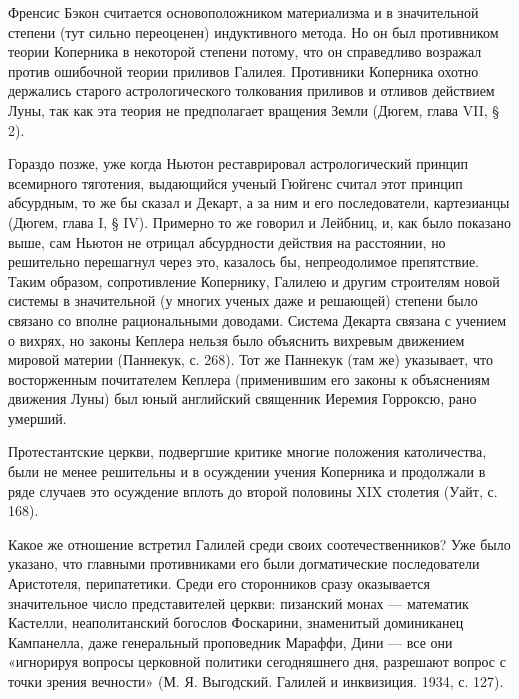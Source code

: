 Френсис Бэкон считается основоположником материализма и в значительной
степени  (тут  сильно  переоценен)  индуктивного  метода.  Но  он  был
противником  теории  Коперника  в  некоторой степени  потому,  что  он
справедливо  возражал   против  ошибочной  теории   приливов  Галилея.
Противники   Коперника  охотно   держались  старого   астрологического
толкования приливов  и отливов действием  Луны, так как эта  теория не
предполагает вращения Земли (Дюгем, глава VII, § 2).

Гораздо позже, уже когда  Ньютон реставрировал астрологический принцип
всемирного тяготения,  выдающийся ученый  Гюйгенс считал  этот принцип
абсурдным, то  же бы сказал  и Декарт, а  за ним и  его последователи,
картезианцы (Дюгем, глава I, § IV).  Примерно то же говорил и Лейбниц,
и, как было показано выше,  сам Ньютон не отрицал абсурдности действия
на  расстоянии,  но  решительно  перешагнул через  это,  казалось  бы,
непреодолимое  препятствие.  Таким образом,  сопротивление  Копернику,
Галилею и  другим строителям  новой системы  в значительной  (у многих
ученых даже и  решающей) степени было связано  со вполне рациональными
доводами.  Система  Декарта связана  с  учением  о вихрях,  но  законы
Кеплера  нельзя  было  объяснить вихревым  движением  мировой  материи
(Паннекук,  с.  268).   Тот  же  Паннекук  (там   же)  указывает,  что
восторженным почитателем Кеплера (применившим его законы к объяснениям
движения Луны)  был юный  английский священник Иеремия  Горроксю, рано
умерший.

Протестантские   церкви,    подвергшие   критике    многие   положения
католичества, были не менее решительны  и в осуждении учения Коперника
и продолжали  в ряде случаев  это осуждение вплоть до  второй половины
XIX столетия (Уайт, с. 168).

Какое  же отношение  встретил Галилей  среди своих  соотечественников?
Уже  было указано,  что главными  противниками его  были догматические
последователи  Аристотеля, перипатетики.  Среди его  сторонников сразу
оказывается значительное число  представителей церкви: пизанский монах
--- математик Кастелли,  неаполитанский богослов Фоскарини, знаменитый
доминиканец Кампанелла, даже генеральный проповедник Мараффи, Дини ---
все  они  «игнорируя  вопросы  церковной  политики  сегодняшнего  дня,
разрешают вопрос с точки зрения  вечности» (М. Я. Выгодский. Галилей и
инквизиция. 1934, с. 127).

